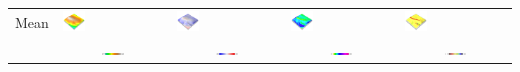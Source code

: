 \documentclass[prodmode,acmtochi]{acmsmall} %
\begin{document}
\begin{table}
{\begin{tabular}{m{} m{} m{} m{} m{}}
%
Mean & 
\includegraphics[width=0.22\textwidth]{images/render_3d/mean_dem_4.png} &
\includegraphics[width=0.22\textwidth]{images/render_3d/mean_dem_difference_4.png} &
\includegraphics[width=0.22\textwidth]{images/render_3d/mean_slope_4.png} &
\includegraphics[width=0.22\textwidth]{images/render_3d/mean_forms_4.png}\\
%
&
\multicolumn{1}{c}{\includegraphics[width=0.22\textwidth]{images/legends/elevation_legend_4.pdf}} &
\multicolumn{1}{c}{\includegraphics[width=0.22\textwidth]{images/legends/diff_legend_4.pdf}} &
\multicolumn{1}{c}{\includegraphics[width=0.22\textwidth]{images/legends/slope_legend_1.pdf}} &
\multicolumn{1}{c}{\includegraphics[width=0.22\textwidth]{images/legends/forms_legend.pdf}}\\
%
\bottomrule
\end{tabular}}
\label{table:difference_experiment} 
%
\vspace*{1.5em}

\end{table}
\end{document}
